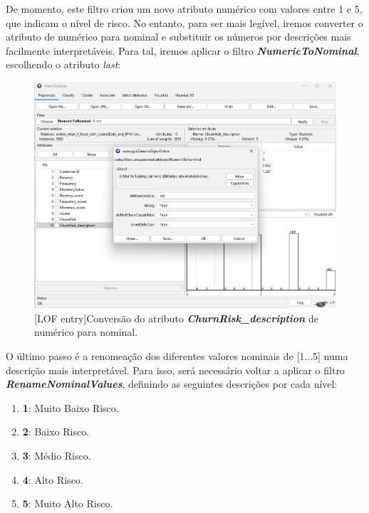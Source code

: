 \documentclass{easychair}
\begin{document}
De momento, este filtro criou um novo atributo numérico com valores entre 1 e 5, que indicam o nível de risco. No entanto, para ser mais legível, iremos converter o atributo de numérico para nominal e substituir os números por descrições mais facilmente interpretáveis. Para tal, iremos aplicar o filtro \textit{\textbf{NumericToNominal}}, escolhendo o atributo \textit{last}:

\begin{figure}[H]
    \begin{centering}
    \includegraphics[width=1\linewidth]{imagens/figure22.jpg}\label{cap-4-fig22}
    [LOF entry]{Conversão do atributo \textit{\textbf{ChurnRisk_description}} de numérico para nominal.}
    \label{fig22}
    \end{centering}
\end{figure}

O último passo é a renomeação dos diferentes valores nominais de [1...5] numa descrição mais interpretável. Para isso, será necessário voltar a aplicar o filtro \textit{\textbf{RenameNominalValues}}, definindo as seguintes descrições por cada nível:

\begin{enumerate}
	\item[\textbullet] \textbf{1}: Muito Baixo Risco.
	\item[\textbullet] \textbf{2}: Baixo Risco.
	\item[\textbullet] \textbf{3}: Médio Risco.
	\item[\textbullet] \textbf{4}: Alto Risco.
	\item[\textbullet] \textbf{5}: Muito Alto Risco.
\end{enumerate}
\end{document}
